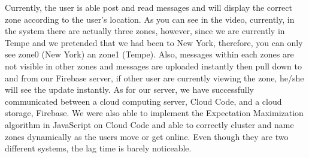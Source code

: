 Currently, the user is able post and read messages and will display the correct zone according to the user's location. As you can see in the video, currently, in the system there are actually three zones, however, since we are currently in Tempe and we pretended that we had been to New York, therefore, you can only see zone0 (New York) an zone1 (Tempe). Also, messages within each zones are not visible in other zones and messages are uploaded instantly then pull down to and from our Firebase server, if other user are currently viewing the zone, he/she will see the update instantly. As for our server, we have successfully communicated between a cloud computing server, Cloud Code, and a cloud storage, Firebase. We were also able to implement the Expectation Maximization algorithm in JavaScript on Cloud Code and able to correctly cluster and name zones dynamically as the users move or get online. Even though they are two different systems, the lag time is barely noticeable. 
